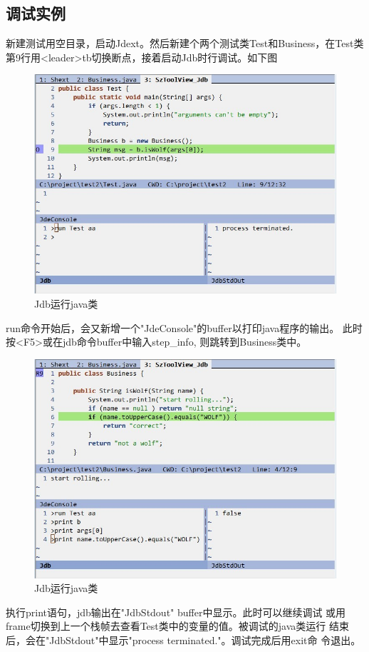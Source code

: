\documentclass[oneside,openany]{book}
\begin{document}
  \subsection{调试实例}
  新建测试用空目录，启动Jdext。然后新建个两个测试类Test和Business，在Test类
第9行用<leader>tb切换断点，接着启动Jdb时行调试。如下图
  \FloatBarrier
  \begin{figure}[H]%
  \centering
  \includegraphics[scale=0.5]{jdb-run.jpg}
  \caption{Jdb运行java类}
  \end{figure}
  run命令开始后，会又新增一个"JdeConsole"的buffer以打印java程序的输出。
  此时按<F5>或在jdb命令buffer中输入step\_info, 则跳转到Business类中。
  \FloatBarrier
  \begin{figure}[H]%
  \centering
  \includegraphics[scale=0.5]{jdb-print2.jpg}
  \caption{Jdb运行java类}
  \end{figure}
  执行print语句，jdb输出在"JdbStdout" buffer中显示。此时可以继续调试
或用frame切换到上一个栈帧去查看Test类中的变量的值。被调试的java类运行
结束后，会在"JdbStdout"中显示"process terminated."。调试完成后用exit命
令退出。
\end{document}
